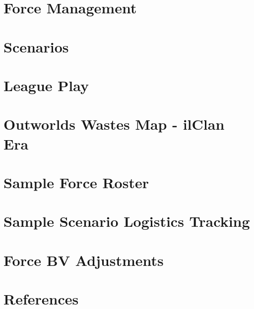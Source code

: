 \documentclass{article}
\newcommand{\sectiontitle}{}
\newcommand{\newsection}[2]{\renewcommand{\sectiontitle}{#2}\section{#1}}
\begin{document}


\newsection{Force Management}{force-management}



\newpage

\newsection{Scenarios}{scenarios}



\newpage

\newsection{League Play}{league-play}



\newpage

\newsection{Outworlds Wastes Map - ilClan Era}{outworlds-wastes-map}



\newpage

\newsection{Sample Force Roster}{sample-force-roster}



\newpage

\newsection{Sample Scenario Logistics Tracking}{sample-logistics}



\newpage

\newsection{Force BV Adjustments}{bv-adjustments}
\label{sec:force_bv_adjustments}



\newpage

\newsection{References}{references}



\newpage
\end{document}
